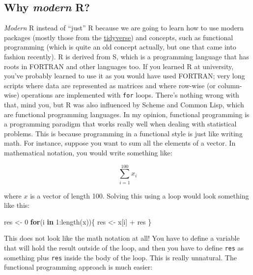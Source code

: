 \documentclass[
]{article}
\newenvironment{Shaded}{\begin{snugshade}}{\end{snugshade}}
\newcommand{\ControlFlowTok}[1]{\textcolor[rgb]{0.13,0.29,0.53}{\textbf{#1}}}
\newcommand{\DecValTok}[1]{\textcolor[rgb]{0.00,0.00,0.81}{#1}}
\newcommand{\FunctionTok}[1]{\textcolor[rgb]{0.00,0.00,0.00}{#1}}
\newcommand{\NormalTok}[1]{#1}
\newcommand{\OtherTok}[1]{\textcolor[rgb]{0.56,0.35,0.01}{#1}}
\newcommand{\SpecialCharTok}[1]{\textcolor[rgb]{0.00,0.00,0.00}{#1}}
\begin{document}
\hypertarget{why-modern-r}{%
\subsection*{\texorpdfstring{Why \emph{modern} R?}{Why modern R?}}\label{why-modern-r}}

\emph{Modern} R instead of ``just'' R because we are going to learn how to use modern packages (mostly
those from the \href{https://www.tidyverse.org/}{tidyverse}) and concepts, such as functional
programming (which is quite an old concept actually, but one that came into fashion recently). R is
derived from S, which is a programming language that has roots in FORTRAN and other languages too.
If you learned R at university, you've probably learned to use it as you would have used FORTRAN;
very long scripts where data are represented as matrices and where row-wise (or column-wise)
operations are implemented with \texttt{for} loops. There's nothing wrong with that, mind you, but R
was also influenced by Scheme and Common Lisp, which are functional programming languages.
In my opinion, functional programming is a programming paradigm that works really well when dealing
with statistical problems. This is because programming in a functional style is just like
writing math. For instance, suppose you want to sum all the elements of a vector. In mathematical
notation, you would write something like:

\[
\sum_{i = 1}^{100} x_{i}
\]

where \(x\) is a vector of length 100. Solving this using a loop would look something like this:

\begin{Shaded}
\begin{Highlighting}[]
\NormalTok{res }\OtherTok{\textless{}{-}} \DecValTok{0}
\ControlFlowTok{for}\NormalTok{(i }\ControlFlowTok{in} \DecValTok{1}\SpecialCharTok{:}\FunctionTok{length}\NormalTok{(x))\{}
\NormalTok{  res }\OtherTok{\textless{}{-}}\NormalTok{ x[i] }\SpecialCharTok{+}\NormalTok{ res}
\NormalTok{\}}
\end{Highlighting}
\end{Shaded}

This does not look like the math notation at all! You have to define a variable that will hold
the result outside of the loop, and then you have to define \texttt{res} as something plus \texttt{res} inside
the body of the loop. This is really unnatural. The functional programming approach is much
easier:
\end{document}
